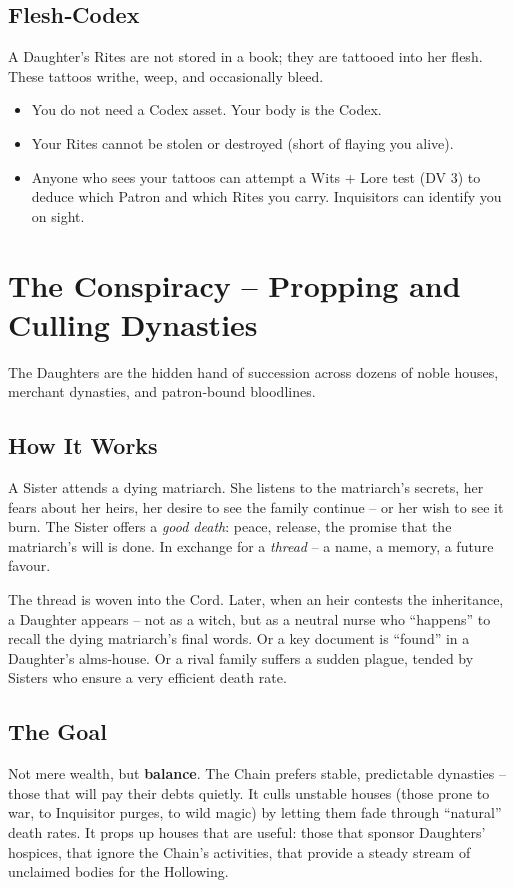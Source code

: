 \documentclass[10pt,twoside]{book}
\begin{document}
\section{Flesh‑Codex}
A Daughter's Rites are not stored in a book; they are tattooed into her flesh. These tattoos writhe, weep, and occasionally bleed.
\begin{itemize}
\item You do not need a Codex asset. Your body is the Codex.
\item Your Rites cannot be stolen or destroyed (short of flaying you alive).
\item Anyone who sees your tattoos can attempt a Wits + Lore test (DV 3) to deduce which Patron and which Rites you carry. Inquisitors can identify you on sight.
\end{itemize}

\chapter{The Conspiracy – Propping and Culling Dynasties}

The Daughters are the hidden hand of succession across dozens of noble houses, merchant dynasties, and patron‑bound bloodlines.

\section{How It Works}
A Sister attends a dying matriarch. She listens to the matriarch’s secrets, her fears about her heirs, her desire to see the family continue – or her wish to see it burn. The Sister offers a \textit{good death}: peace, release, the promise that the matriarch's will is done. In exchange for a \textit{thread} – a name, a memory, a future favour.

The thread is woven into the Cord. Later, when an heir contests the inheritance, a Daughter appears – not as a witch, but as a neutral nurse who “happens” to recall the dying matriarch's final words. Or a key document is “found” in a Daughter's alms‑house. Or a rival family suffers a sudden plague, tended by Sisters who ensure a very efficient death rate.

\section{The Goal}
Not mere wealth, but \textbf{balance}. The Chain prefers stable, predictable dynasties – those that will pay their debts quietly. It culls unstable houses (those prone to war, to Inquisitor purges, to wild magic) by letting them fade through “natural” death rates. It props up houses that are useful: those that sponsor Daughters' hospices, that ignore the Chain's activities, that provide a steady stream of unclaimed bodies for the Hollowing.
\end{document}
